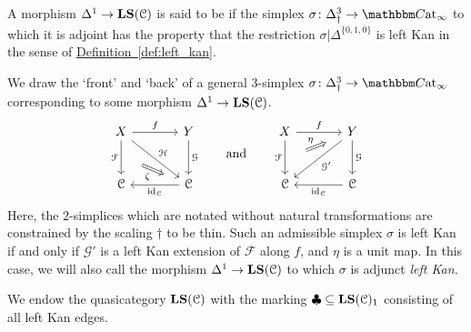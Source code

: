 \documentclass[main.tex]{subfiles}
\begin{document}
\begin{definition}
  \label{def:left_kan_simplex}
  A morphism $\Delta^{1} \to \mathbf{LS}(\mathcal{C})$ is said to be  if the simplex $\sigma\colon \Delta^{3}_{\dagger} \to \ICCat$ to which it is adjoint has the property that the restriction $\sigma|\Delta^{\{0,1,\overline{0}\}}$ is left Kan in the sense of \hyperref[def:left_kan]{Definition~\ref*{def:left_kan}}.
\end{definition}

We draw the `front' and `back' of a general $3$-simplex $\sigma\colon \Delta^{3}_{\dagger} \to \ICCat$ corresponding to some morphism $\Delta^{1} \to \mathbf{LS}(\mathcal{C})$.
\begin{equation*}
  \begin{tikzcd}[column sep=large, row sep=large]
    X
    \arrow[r, "f"]
    \arrow[d, "\mathcal{F}"{swap}, ""{name=L}]
    \arrow[dr, "\mathcal{H}"]
    & Y
    \arrow[d, "\mathcal{G}"]
    \\
    \category{C}
    & \category{C}
    \arrow[l, "\id_{\category{C}}"]
    \arrow[from=L, Rightarrow, shorten=3ex, "\zeta"{swap}]
  \end{tikzcd}
  \qquad\text{and}\qquad
  \begin{tikzcd}[column sep=large, row sep=large]
    X
    \arrow[r, "f"]
    \arrow[d, "\mathcal{F}"{swap}, ""{name=L}]
    & Y
    \arrow[d, "\mathcal{G}"]
    \arrow[dl, "\mathcal{G}'"]
    \arrow[from=L, Rightarrow, shorten=3ex, "\eta"]
    \\
    \category{C}
    & \category{C}
    \arrow[l, "\id_{\category{C}}"]
  \end{tikzcd}
\end{equation*}
Here, the $2$-simplices which are notated without natural transformations are constrained by the scaling $\dagger$ to be thin. Such an admissible simplex $\sigma$ is left Kan if and only if $\mathcal{G}'$ is a left Kan extension of $\mathcal{F}$ along $f$, and $\eta$ is a unit map. In this case, we will also call the morphism $\Delta^{1} \to \mathbf{LS}(\mathcal{C})$ to which $\sigma$ is adjunct \emph{left Kan.}

\begin{notation}
  We endow the quasicategory $\mathbf{LS}(\mathcal{C})$ with the marking $\clubsuit \subseteq \mathbf{LS}(\mathcal{C})_{1}$ consisting of all left Kan edges.
\end{notation}
\end{document}
